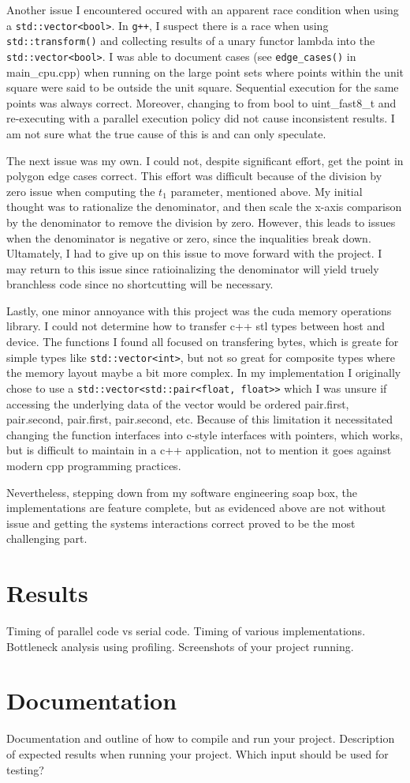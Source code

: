 \documentclass{article}
\begin{document}
Another issue I encountered occured with an apparent race condition when using a \texttt{std::vector<bool>}. In \texttt{g++}, I suspect there is a race when using \texttt{std::transform()} and collecting results of a unary functor lambda into the \texttt{std::vector<bool>}. I was able to document cases (see \texttt{edge\_cases()} in main\_cpu.cpp) when running on the large point sets where points within the unit square were said to be outside the unit square. Sequential execution for the same points was always correct. Moreover, changing to from bool to uint\_fast8\_t and re-executing with a parallel execution policy did not cause inconsistent results. I am not sure what the true cause of this is and can only speculate.  

The next issue was my own. I could not, despite significant effort, get the point in polygon edge cases correct. This effort was difficult because  of the division by zero issue when computing the $t_1$ parameter, mentioned above. My initial thought was to rationalize the denominator, and then scale the x-axis comparison by the denominator to remove the division by zero. However, this leads to issues when the denominator is negative or zero, since the inqualities break down. Ultamately, I had to give up on this issue to move forward with the project. I may return to this issue since ratioinalizing the denominator will yield truely branchless code since no shortcutting will be necessary.

Lastly, one minor annoyance with this project was the cuda memory operations library. I could not determine how to transfer c++ stl types between host and device. The functions I found all focused on transfering bytes, which is greate for simple types like \texttt{std::vector<int>}, but not so great for composite types where the memory layout maybe a bit more complex. In my implementation I originally chose to use a \texttt{std::vector<std::pair<float, float>>} which I was unsure if accessing the underlying data of the vector would be ordered pair.first, pair.second, pair.first, pair.second, etc. Because of this limitation it necessitated changing the function interfaces into c-style interfaces with pointers, which works, but is difficult to maintain in a c++ application, not to mention it goes against modern cpp programming practices.

Nevertheless, stepping down from my software engineering soap box, the implementations are feature complete, but as evidenced above are not without issue and getting the systems interactions correct proved to be the most challenging part.
 

\section{Results}
Timing of parallel code vs serial code. 
Timing of various implementations. 
Bottleneck analysis using profiling. 
Screenshots of your project running.

\section{Documentation}
Documentation and outline of how to compile and run your project. Description of expected results when running your project. Which input should be used for testing?
\end{document}
